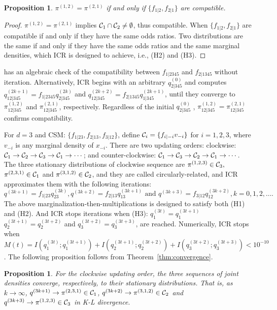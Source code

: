 \documentclass[12pt,a4paper]{article}
\newtheorem{proposition}[definition]{Proposition}
\begin{document}
\begin{proposition}
$\pi^{(1,2)} =\pi^{(2,1)}$ if and only if $\{f_{1|2}, f_{2|1}\}$ are compatible.
\end{proposition}
\begin{proof}
$\pi^{(1,2)} =\pi^{(2,1)}$ implies ${\cal C}_1 \cap {\cal C}_2 \ne \emptyset$, thus compatible.  When $\{f_{1|2}, f_{2|1}\}$ are compatible if and only if they have the same odds ratios.
Two distributions are the same if and only if they have the same odds ratios and the same marginal densities, which ICR is designed to achieve, i.e., (H2) and (H3).
\end{proof}

\citet{Wang2008} has an algebraic check of the compatibility between $f_{1|2345}$ and $f_{2|1345}$ without iteration.
Alternatively, ICR  begins with an arbitrary $q^{(0)}_{2|345}$  and computes $q^{(2k+1)}_{12|345}=f_{1|2345}q^{(2k)}_{2|345}$ and $q^{(2k+2)}_{12|345}=f_{2|1345} q^{(2k+1)}_{1|345}$, until they converge to $\pi^{(1,2)}_{12|345}$ and $ \pi^{(2,1)}_{12|345}$, respectively.   Regardless of the initial $q^{(0)}_{2|345}$ , $\pi^{(1,2)}_{12|345} =\pi^{(2,1)}_{12|345}$ confirms compatibility.

For $d=3$ and CSM: $\{f_{1|23}, f_{2|13}, f_{3|12}\}$, define
${\cal C}_i=\{f_{i|-i} v_{-i}\}$ for $i=1,2,3$, where $v_{-i}$ is any marginal density of $x_{-i}$.
There are two updating orders: clockwise: ${\cal C}_1\to {\cal C}_2 \to {\cal C}_3 \to {\cal C}_1 \to \cdots$; and counter-clockwise: ${\cal C}_1\to {\cal C}_3 \to {\cal C}_2 \to {\cal C}_1 \to \cdots$.
The three stationary distributions of clockwise sequence are
$ \pi^{(1,2,3)} \in {\cal C}_3,$ $\pi^{(2,3,1)} \in {\cal C}_1$ and $\pi^{(3,1,2)} \in {\cal C}_2$, and they are called circularly-related, and ICR approximates them with the following iterations:
\[ q^{(3k+1)}=f_{1|23} q^{(3k)}_{23}, q^{(3k+2)}=f_{2|13} q^{(3k+1)}_{13} \mbox{ and }
 q^{(3k+3)}=f_{3|12} q^{(3k+2)}_{12},k=0,1,2,\ldots .\]
The above marginalization-then-multiplications is designed to satisfy both (H1) and (H2). And
ICR stops iterations when (H3): $q^{(3t)}_{1}=q^{(3t+1)}_{1}$ $q^{(3t+1)}_{2}=q^{(3t+2)}_{2}$ and $q^{(3t+2)}_{3}=q^{(3t+3)}_{3}$, are reached.
Numerically,  ICR stops when  $M(t)=I(q_{1}^{(3t)};q_{1}^{(3t+1)})+I(q_{2}^{(3t+1)};q_{2}^{(3t+2)})
+I(q_{3}^{(3t+2)};q_{3}^{(3t+3)})<10^{-10}$.  The following proposition follows from Theorem~\ref{thm:convergence}.

\begin{proposition}
For the clockwise updating order, the three sequences of joint densities converge,
respectively, to their stationary distributions.  That is, as $k \rightarrow \infty$,
$q^{(3k+1)} \to \pi^{(2,3,1)} \in {\cal C}_1$,
$q^{(3k+2)} \to \pi^{(3,1,2)} \in {\cal C}_2$
and $q^{(3k+3)} \to \pi^{(1,2,3)} \in {\cal C}_3$ in K-L divergence.
\end{proposition}
\end{document}
